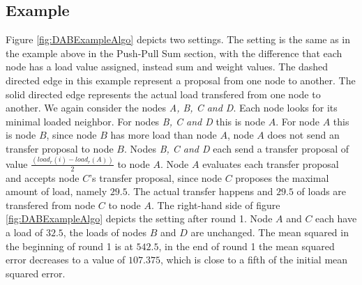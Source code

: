 \subsection{Example}\label{subsec:exampleDAB}
 Figure \ref{fig:DABExampleAlgo} depicts two settings. The setting is the same as in the example above in the Push-Pull Sum section, with the difference that each node has a load value assigned, instead sum and weight values. The dashed directed edge in this example represent a proposal from one node to another. The solid directed edge represents the actual load transfered from one node to another. We again consider the nodes \textit{A, B, C and D}. Each node looks for its minimal loaded neighbor. For nodes \textit{B, C and D} this is node $A$. For node $A$ this is node $B$, since node $B$ has more load than node $A$, node $A$ does not send an transfer proposal to node $B$. Nodes \textit{B, C and D} each send a transfer proposal of value $\frac{(load_r(i)-load_r(A))}{2}$ to node $A$. Node $A$ evaluates each transfer proposal and accepts node $C$'s transfer proposal, since node $C$ proposes the maximal amount of load, namely $29.5$. The actual transfer happens and $29.5$ of loads are transfered from node $C$ to node $A$. The right-hand side of figure \ref{fig:DABExampleAlgo} depicts the setting after round 1. Node $A$ and $C$ each have a load of $32.5$, the loads of nodes $B$
 and $D$ are unchanged. The mean squared in the beginning of round 1 is at $542.5$, in the end of round 1 the mean squared error decreases to a value of $107.375$, which is close to a fifth of the initial mean squared error. 

